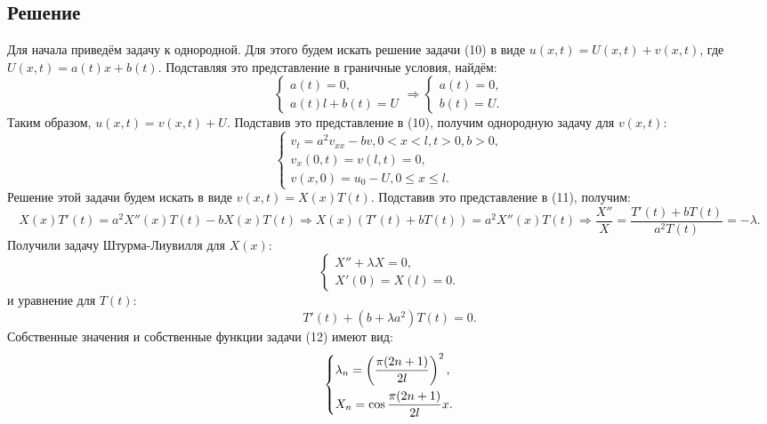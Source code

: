 \documentclass[11pt]{article}
\begin{document}
\subsection{Решение}
\label{sec:org5fe4c18}
Для начала приведём задачу к однородной. Для этого будем искать решение задачи (10) в виде
\(u(x, t) = U(x, t) + v(x, t)\), где \(U(x, t) = a(t)x + b(t)\). Подставляя это представление в
граничные условия, найдём:
\begin{equation*}
\begin{cases}
a(t) = 0, \\
a(t)l + b(t) = U
\end{cases}
\Rightarrow
\begin{cases}
a(t) = 0, \\
b(t) = U.
\end{cases}
\end{equation*}
Таким образом, $u(x, t) = v(x, t) + U$. Подставив это представление в (10), получим однородную
задачу для $v(x, t)$:
\begin{equation}
\begin{cases}
v_t = a^2v_{xx} - bv, 0 < x < l, t > 0, b > 0, \\
v_x(0, t) = v(l, t) = 0, \\
v(x, 0) = u_0 - U, 0 \leq x \leq l.
\end{cases}
\end{equation}
Решение этой задачи будем искать в виде $v(x, t) = X(x)T(t)$. Подставив это представление в (11),
получим:
\begin{equation*}
X(x)T'(t) = a^2X''(x)T(t) - bX(x)T(t) \Rightarrow X(x)(T'(t) + bT(t)) = a^2X''(x)T(t) \Rightarrow
\frac{X''}{X} = \frac{T'(t) + bT(t)}{a^2T(t)} = -\lambda.
\end{equation*}
Получили задачу Штурма-Лиувилля для $X(x)$:
\begin{equation}
\begin{cases}
X'' + \lambda X = 0, \\
X'(0) = X(l) = 0.
\end{cases}
\end{equation}
и уравнение для $T(t)$:
\begin{equation}
T'(t) + (b + \lambda a^2)T(t) = 0.
\end{equation}
Собственные значения и собственные функции задачи (12) имеют вид:
\begin{equation*}
\begin{dcases}
\lambda_n = \left(\frac{\pi(2n + 1)}{2l}\right)^2, \\
X_n = \cos\frac{\pi(2n + 1)}{2l}x.
\end{dcases}
\end{equation*}
\end{document}
